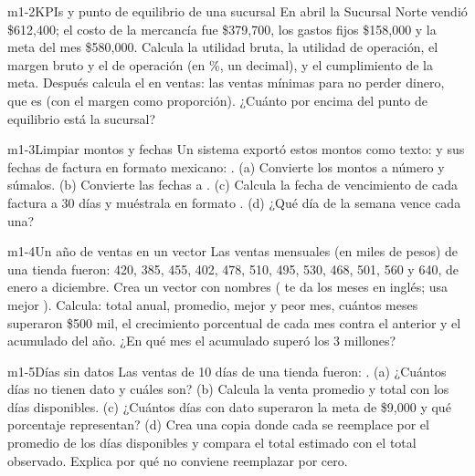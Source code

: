 \begin{ejercicio}{m1-2}{KPIs y punto de equilibrio de una sucursal}
En abril la Sucursal Norte vendió \$612,400; el costo de la mercancía fue
\$379,700, los gastos fijos \$158,000 y la meta del mes \$580,000. Calcula
la utilidad bruta, la utilidad de operación, el margen bruto y el de
operación (en \%, un decimal), y el cumplimiento de la meta. Después
calcula el  en ventas: las ventas mínimas para
no perder dinero, que es  (con el
margen como proporción). ¿Cuánto por encima del punto de equilibrio está la
sucursal?
\end{ejercicio}

\begin{ejercicio}{m1-3}{Limpiar montos y fechas}
Un sistema exportó estos montos como texto:
 y sus
fechas de factura en formato mexicano:
.
(a) Convierte los montos a número y súmalos. (b) Convierte las fechas a
. (c) Calcula la fecha de vencimiento de cada factura a 30
días y muéstrala en formato . (d) ¿Qué día de la semana
vence cada una?
\end{ejercicio}

\begin{ejercicio}{m1-4}{Un año de ventas en un vector}
Las ventas mensuales (en miles de pesos) de una tienda fueron: 420, 385,
455, 402, 478, 510, 495, 530, 468, 501, 560 y 640, de enero a diciembre.
Crea un vector con nombres ( te da los meses en inglés;
usa mejor ). Calcula: total anual,
promedio, mejor y peor mes, cuántos meses superaron \$500 mil, el
crecimiento porcentual de cada mes contra el anterior y el acumulado del
año. ¿En qué mes el acumulado superó los 3 millones?
\end{ejercicio}

\begin{ejercicio}{m1-5}{Días sin datos}
Las ventas de 10 días de una tienda fueron:
.
(a) ¿Cuántos días no tienen dato y cuáles son? (b) Calcula la venta
promedio y total con los días disponibles. (c) ¿Cuántos días con dato
superaron la meta de \$9,000 y qué porcentaje representan? (d) Crea una
copia donde cada  se reemplace por el promedio de los días
disponibles y compara el total estimado con el total observado. Explica
por qué no conviene reemplazar por cero.
\end{ejercicio}

